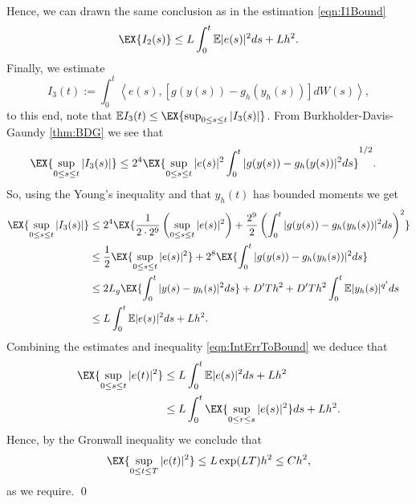 \documentclass[sort&compress, preprint]{elsarticle}
\theoremstyle{definition}
\theoremstyle{plain}%
\theoremstyle{remark}
\newcommand{\m}[1]{\mathbb{E}#1}
\newcommand{\innerprod}[2]{\left\langle#1, #2\right\rangle}
\begin{document}
\begin{pf}
\begin{align*}
	\end{align*}
	Hence, we can drawn the same conclusion  as in the estimation \eqref{eqn:I1Bound}
	\begin{equation} 
		\EX{
			I_2(s)	
		}
		\leq
		L\int_{0}^t
		\m{|e(s)|^2} ds
		+ L h^2.
	\end{equation}
	Finally, we estimate
	\begin{equation*}
		I_3(t):= 
			\int_{0}^t
				\innerprod{e(s)}{\left[g(y(s)) - g_h(y_h(s))\right] dW(s)},
	\end{equation*}
	to this end, note that 
	$
		\m I_3(t) \leq \EX{ 
				\sup_{0\leq s \leq t}
				|I_3(s)|
			}
	$.
	From Burkholder-Davis-Gaundy \eqref{thm:BDG} 	we see that
	\begin{align*}
		\EX{ 
			\sup_{0\leq s \leq t}
			|I_3(s)|
		} 
		&\leq
		2^4 
		\EX{
			\sup_{0 \leq s \leq t}
			|e(s)|^2
			\int_{0}^t
				|g(y(s))-g_h(y(s))|^2 ds
		}^{1/2}.
	\end{align*}	
	So, using the Young's inequality   and that
	$y_h(t)$ has bounded moments we get
	\begin{align}
		\EX{ 
			\sup_{0\leq s \leq t}
			|I_3(s)|
		}
		&\leq
		2^4 
		\EX{
			\frac{1}{2 \cdot 2^9}
			\left(
				\sup_{0\leq s \leq t}
				|e(s)|^2
			\right)			
			+
			\frac{2^9}{2}
			\left(
				\int_{0}^t
					|g(y(s)) - g_h(y_h(s))|^2 ds
			\right)^2
		}
		\notag \\
		&\leq
			\frac{1}{2}
			\EX{
				\sup_{0 \leq s \leq t}
				|e(s)|^2
			}
		+2^8
		\EX{
			\int_{0}^t
				|g(y(s)) - g_h(y_h(s))|^2	
			ds
		}\notag\\
		&\leq
			2 L_g
			\EX{
				\int_{0}^t
					|y(s) - y_h(s)|^2 ds		
				} 
			+D'Th^2 
			+
			D'Th^2
			\int_{0}^t
				\m{|y_h(s)|^{q'}} ds 	
		\notag \\
		&\leq
			L
			\int_{0}^t
				\m |e(s)|^2 ds
			+L h^2. \label{eqn:I3Bound}
	\end{align}
	Combining the estimates  and inequality \eqref{eqn:IntErrToBound} we deduce that
	\begin{align*}
		\EX{
			\sup_{0\leq s \leq t}	
			|e(t)|^2
		}
		&\leq
			L \int_0^t
				\m |e(s)|^2 ds
			+
			L h^2 \notag \\			
%
		&\leq		
			L \int_{0}^t
				\EX{
					\sup_{0\leq r \leq s}
					|e(s)|^2	
				}ds
			+Lh^2.		
	\end{align*}
	Hence, by the Gronwall inequality we conclude that
	\begin{equation*}
		\EX{
			\sup_{0 \leq t \leq T} 	
			|e(t)|^2
		}
		\leq
			L  \exp(LT) h^2 \leq C h^2,
	\end{equation*} 	
	as we require.
		\qed
\end{pf}
\end{document}
